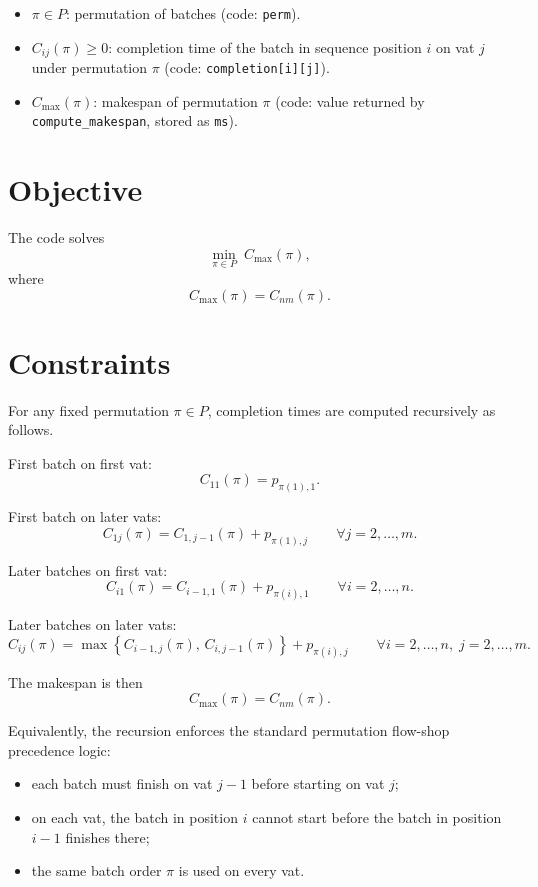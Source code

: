 \begin{itemize}
    \item $\pi \in P$: permutation of batches (code: \texttt{perm}).
    \item $C_{ij}(\pi) \ge 0$: completion time of the batch in sequence position $i$ on vat $j$ under permutation $\pi$ (code: \texttt{completion[i][j]}).
    \item $C_{\max}(\pi)$: makespan of permutation $\pi$ (code: value returned by \texttt{compute\_makespan}, stored as \texttt{ms}).
\end{itemize}

\section*{Objective}

The code solves
\[
\min_{\pi \in P} \; C_{\max}(\pi),
\]
where
\[
C_{\max}(\pi) = C_{nm}(\pi).
\]

\section*{Constraints}

For any fixed permutation $\pi \in P$, completion times are computed recursively as follows.

First batch on first vat:
\[
C_{11}(\pi) = p_{\pi(1),1}.
\]

First batch on later vats:
\[
C_{1j}(\pi) = C_{1,j-1}(\pi) + p_{\pi(1),j}
\qquad \forall j=2,\dots,m.
\]

Later batches on first vat:
\[
C_{i1}(\pi) = C_{i-1,1}(\pi) + p_{\pi(i),1}
\qquad \forall i=2,\dots,n.
\]

Later batches on later vats:
\[
C_{ij}(\pi) =
\max\!\left\{C_{i-1,j}(\pi),\, C_{i,j-1}(\pi)\right\} + p_{\pi(i),j}
\qquad \forall i=2,\dots,n,\; j=2,\dots,m.
\]

The makespan is then
\[
C_{\max}(\pi) = C_{nm}(\pi).
\]

Equivalently, the recursion enforces the standard permutation flow-shop precedence logic:
\begin{itemize}
    \item each batch must finish on vat $j-1$ before starting on vat $j$;
    \item on each vat, the batch in position $i$ cannot start before the batch in position $i-1$ finishes there;
    \item the same batch order $\pi$ is used on every vat.
\end{itemize}

